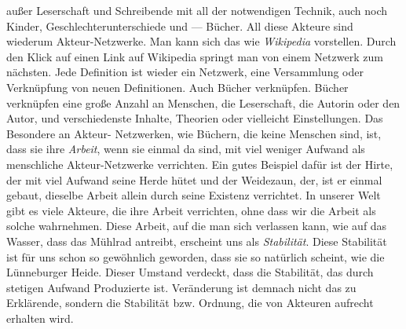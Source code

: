 außer Leserschaft und Schreibende mit all der notwendigen Technik, auch noch
Kinder, Geschlechterunterschiede und --- Bücher. All diese Akteure sind wiederum
Akteur-Netzwerke. Man kann sich das wie \emph{Wikipedia} vorstellen. Durch den
Klick auf einen Link auf Wikipedia springt man von einem Netzwerk zum nächsten.
Jede Definition ist wieder ein Netzwerk, eine Versammlung oder Verknüpfung von
neuen Definitionen. Auch Bücher verknüpfen. Bücher verknüpfen eine große Anzahl
an Menschen, die Leserschaft, die Autorin oder den Autor, und verschiedenste
Inhalte, Theorien oder vielleicht Einstellungen.   Das Besondere an Akteur-
Netzwerken, wie Büchern, die keine Menschen sind, ist, dass sie ihre
\emph{Arbeit}, wenn sie einmal da sind, mit viel weniger Aufwand als menschliche
Akteur-Netzwerke verrichten.   Ein gutes Beispiel dafür ist der Hirte, der mit
viel Aufwand seine Herde hütet und der Weidezaun, der, ist er einmal gebaut,
dieselbe Arbeit allein durch seine Existenz verrichtet.   In unserer Welt gibt
es viele Akteure, die ihre Arbeit verrichten, ohne dass wir die Arbeit als
solche wahrnehmen.   Diese Arbeit, auf die man sich verlassen kann, wie auf das
Wasser, dass das Mühlrad antreibt, erscheint uns als \emph{Stabilität}.   Diese
Stabilität ist für uns schon so gewöhnlich geworden, dass sie so natürlich
scheint, wie die Lünneburger Heide.   Dieser Umstand verdeckt, dass die
Stabilität, das durch stetigen Aufwand Produzierte ist.   Veränderung ist
demnach nicht das zu Erklärende, sondern die Stabilität bzw. Ordnung, die von
Akteuren aufrecht erhalten wird.


